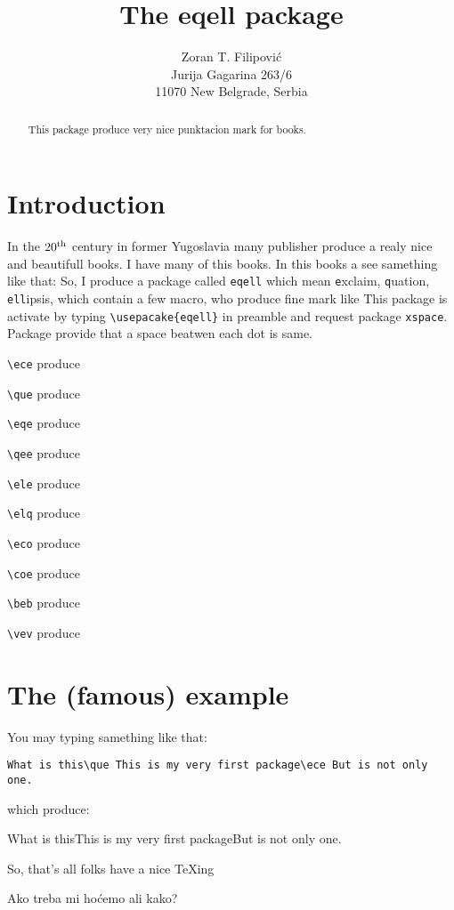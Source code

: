 \documentclass[a4paper,12pt]{article}
\title{The \textsf{eqell} package}
\author{Zoran T. Filipovi\'{c} \\ Jurija Gagarina 263/6 \\ 11070 New Belgrade, Serbia}
\begin{document}
\frenchspacing
\maketitle

\begin{abstract}
This package produce very nice punktacion mark for books.
\end{abstract}

\section{Introduction}

In the $20^{{\rm th}}$ century in former Yugoslavia many publisher produce a realy nice and
beautifull books. I have many of this books. In this books a see samething like that:  So, I produce a package called \verb|eqell| which mean 
\verb|e|xclaim,
\verb|q|uation, \verb|ell|ipsis, which contain a few macro, who produce fine mark like \ece This
package is activate by typing \verb|\usepacake{eqell}| in preamble and request package
\verb|xspace|. Package provide that a space beatwen each dot is same.

\bigskip 

\begin{multicols}{2}
\verb|\ece| produce \ece   

\verb|\que| produce \que 

\verb|\eqe| produce \eqe 

\verb|\qee| produce \qee 

\verb|\ele| produce \ele 

\verb|\elq| produce \elq 

\verb|\eco| produce \eco 

\verb|\coe| produce \coe 

\verb|\beb| produce \beb 

\verb|\vev| produce \vev 

\end{multicols}

\section{The (famous) example}

You may typing samething like that: 

\verb|What is this\que This is my very first package\ece But is not only one.|

\noindent
which produce:

What is this\que This is my very first package\ece But is not only one.

\vfill
\noindent 
So, that's all folks \beb have a nice \TeX ing\ece 

Ako treba mi ho\'{c}emo \vev ali kako?
\end{document}
